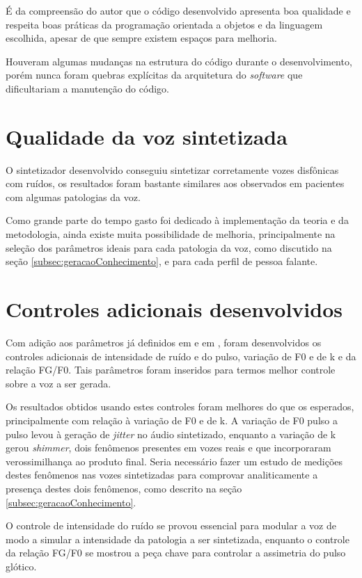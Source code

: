 \documentclass[
  12pt,       
  openright,      
  twoside,      
  a4paper,      
  english,      
  french,       
  spanish,      
  brazil,     
  ]{abntex2}
\begin{document}
É da compreensão do autor que o código desenvolvido apresenta boa qualidade e respeita boas práticas da programação orientada a objetos e da linguagem escolhida, apesar de que sempre existem espaços para melhoria.

Houveram algumas mudanças na estrutura do código durante o desenvolvimento, porém nunca foram quebras explícitas da arquitetura do \textit{software} que dificultariam a manutenção do código.

\section{Qualidade da voz sintetizada}
O sintetizador desenvolvido conseguiu sintetizar corretamente vozes disfônicas com ruídos, os resultados foram bastante similares aos observados em pacientes com algumas patologias da voz.

Como grande parte do tempo gasto foi dedicado à implementação da teoria e da metodologia, ainda existe muita possibilidade de melhoria, principalmente na seleção dos parâmetros ideais para cada patologia da voz, como discutido na seção \ref{subsec:geracaoConhecimento}, e para cada perfil de pessoa falante.

\section{Controles adicionais desenvolvidos}
Com adição aos parâmetros já definidos em  e em , foram desenvolvidos os controles adicionais de intensidade de ruído e do pulso, variação de F0 e de k e da relação FG/F0. Tais parâmetros foram inseridos para termos melhor controle sobre a voz a ser gerada.

Os resultados obtidos usando estes controles foram melhores do que os esperados, principalmente com relação à variação de F0 e de k. A variação de F0 pulso a pulso levou à geração de \textit{jitter} no áudio sintetizado, enquanto a variação de k gerou \textit{shimmer}, dois fenômenos presentes em vozes reais e que incorporaram verossimilhança ao produto final. Seria necessário fazer um estudo de medições destes fenômenos nas vozes sintetizadas para comprovar analiticamente a presença destes dois fenômenos, como descrito na seção \ref{subsec:geracaoConhecimento}.

O controle de intensidade do ruído se provou essencial para modular a voz de modo a simular a intensidade da patologia a ser sintetizada, enquanto o controle da relação FG/F0 se mostrou a peça chave para controlar a assimetria do pulso glótico.
\end{document}

